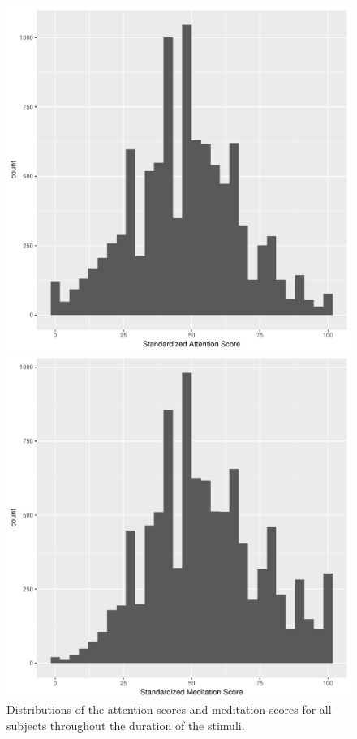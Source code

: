 \documentclass{article}[12pt]
\begin{document}
\begin{figure}[h]
	\centering
	\begin{minipage}{.45\textwidth}
		\centering
		\includegraphics[width=0.9\linewidth]{figures/dista.pdf}
	\end{minipage}
	\begin{minipage}{0.45\textwidth}
		\centering
		\includegraphics[width=0.9\linewidth]{figures/distm.pdf}
	\end{minipage}
	\caption{Distributions of the attention scores and meditation scores for all subjects throughout the duration of the stimuli.}
	\label{fig:dist}
\end{figure}
\end{document}
